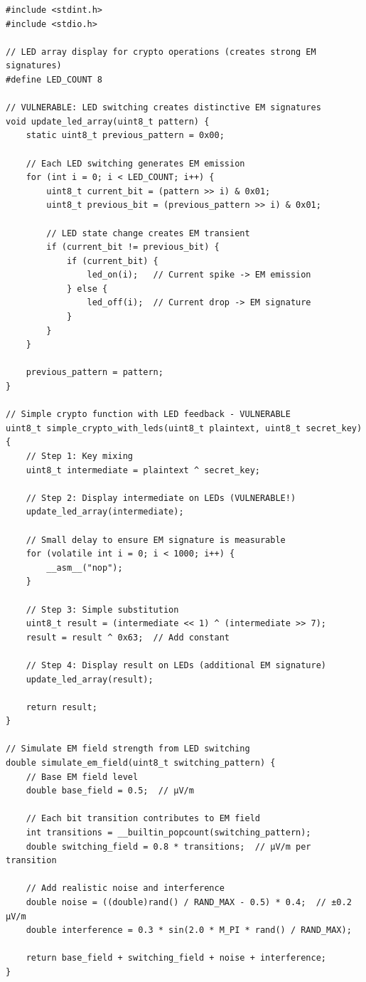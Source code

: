 \documentclass[11pt,a4paper]{article}
\theoremstyle{definition}
\begin{document}
\begin{lstlisting}[caption={LED Array Crypto Display (Vulnerable to EM Analysis)}]
#include <stdint.h>
#include <stdio.h>

// LED array display for crypto operations (creates strong EM signatures)
#define LED_COUNT 8

// VULNERABLE: LED switching creates distinctive EM signatures
void update_led_array(uint8_t pattern) {
    static uint8_t previous_pattern = 0x00;
    
    // Each LED switching generates EM emission
    for (int i = 0; i < LED_COUNT; i++) {
        uint8_t current_bit = (pattern >> i) & 0x01;
        uint8_t previous_bit = (previous_pattern >> i) & 0x01;
        
        // LED state change creates EM transient
        if (current_bit != previous_bit) {
            if (current_bit) {
                led_on(i);   // Current spike -> EM emission
            } else {
                led_off(i);  // Current drop -> EM signature
            }
        }
    }
    
    previous_pattern = pattern;
}

// Simple crypto function with LED feedback - VULNERABLE
uint8_t simple_crypto_with_leds(uint8_t plaintext, uint8_t secret_key) {
    // Step 1: Key mixing
    uint8_t intermediate = plaintext ^ secret_key;
    
    // Step 2: Display intermediate on LEDs (VULNERABLE!)
    update_led_array(intermediate);
    
    // Small delay to ensure EM signature is measurable
    for (volatile int i = 0; i < 1000; i++) {
        __asm__("nop");
    }
    
    // Step 3: Simple substitution
    uint8_t result = (intermediate << 1) ^ (intermediate >> 7);
    result = result ^ 0x63;  // Add constant
    
    // Step 4: Display result on LEDs (additional EM signature)
    update_led_array(result);
    
    return result;
}

// Simulate EM field strength from LED switching
double simulate_em_field(uint8_t switching_pattern) {
    // Base EM field level
    double base_field = 0.5;  // μV/m
    
    // Each bit transition contributes to EM field
    int transitions = __builtin_popcount(switching_pattern);
    double switching_field = 0.8 * transitions;  // μV/m per transition
    
    // Add realistic noise and interference
    double noise = ((double)rand() / RAND_MAX - 0.5) * 0.4;  // ±0.2 μV/m
    double interference = 0.3 * sin(2.0 * M_PI * rand() / RAND_MAX);
    
    return base_field + switching_field + noise + interference;
}
\end{lstlisting}
\end{document}
